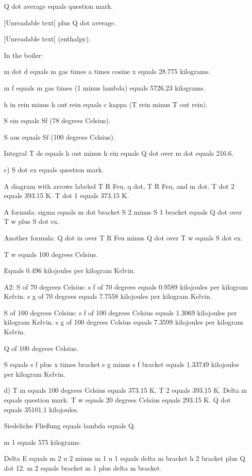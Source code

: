 Q dot average equals question mark.

[Unreadable text] plus Q dot average.

[Unreadable text] (enthalpy).

In the boiler:

m dot d equals m gas times a times cosine x equals 28.775 kilograms.

m f equals m gas times (1 minus lambda) equals 5726.23 kilograms.

h in rein minus h out rein equals c kappa (T rein minus T out rein).

S ein equals Sf (78 degrees Celsius).

S aus equals Sf (100 degrees Celsius).

Integral T ds equals h out minus h ein equals Q dot over m dot equals 216.6.

c) S dot ex equals question mark.

A diagram with arrows labeled T R Feu, q dot, T R Feu, and m dot. T dot 2 equals 393.15 K. T dot 1 equals 373.15 K.

A formula: sigma equals m dot bracket S 2 minus S 1 bracket equals Q dot over T w plus S dot ex.

Another formula: Q dot in over T R Feu minus Q dot over T w equals S dot ex.

T w equals 100 degrees Celsius.

Equals 0.496 kilojoules per kilogram Kelvin.

A2: S of 70 degrees Celsius: s f of 70 degrees equals 0.9589 kilojoules per kilogram Kelvin. s g of 70 degrees equals 7.7558 kilojoules per kilogram Kelvin.

S of 100 degrees Celsius: s f of 100 degrees Celsius equals 1.3069 kilojoules per kilogram Kelvin. s g of 100 degrees Celsius equals 7.3599 kilojoules per kilogram Kelvin.

Q of 100 degrees Celsius.

S equals s f plus x times bracket s g minus s f bracket equals 1.33749 kilojoules per kilogram Kelvin.

d) T m equals 100 degrees Celsius equals 373.15 K. T 2 equals 393.15 K. Delta m equals question mark. T w equals 20 degrees Celsius equals 293.15 K. Q dot equals 35101.1 kilojoules.

Siedeliche Fließung equals lambda equals Q.

m 1 equals 575 kilograms.

Delta E equals m 2 u 2 minus m 1 u 1 equals delta m bracket h 2 bracket plus Q dot 12. m 2 equals bracket m 1 plus delta m bracket.

